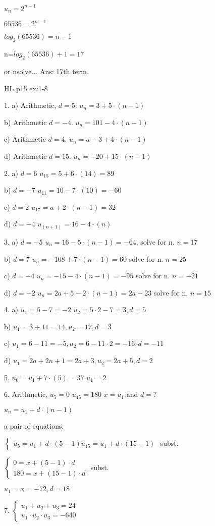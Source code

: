$u_n=2^{n-1}$ 

$65536=2^{n-1}$

$log_2(65536)=n-1$ 

n=$log_2(65536)+1=17$

or nsolve... Ans: 17th term. 

HL p15 ex:1-8 

1. a) Arithmetic, $d=5$. 
$u_n=3+5\cdot (n-1)$

b) Arithmetic $d=-4$. 
$u_n=101-4\cdot(n-1)$ 

c) Arithmetic $d=4$. 
$u_n=a-3+4\cdot(n-1)$

d) Arithmetic $d=15$. 
$u_n=-20+15\cdot (n-1)$

2. a) $d=6$
$u_15=5+6\cdot(14)=89$

b) $d=-7$
$u_11=10-7\cdot(10)=-60$

c) $d=2$
$u_17=a+2\cdot(n-1)=32$

d) $d=-4$
$u_{(n+1)}=16-4\cdot(n)$

3. a) $d=-5$
$u_n=16-5\cdot(n-1)=-64$, solve for n.
$n=17$

b) $d=7$
$u_n=-108+7\cdot(n-1)=60$ solve for n.
$n=25$

c) $d=-4$
$u_n=-15-4\cdot(n-1)=-95$ solve for n.
$n=-21$

d) $d=-2$
$u_n=2a+5-2\cdot(n-1)=2a-23$ solve for n.
$n=15$

4. a) $u_1=5-7=-2$ $u_2=5\cdot2-7=3, d=5$

b) $u_1=3+11=14, u_2=17 ,d=3$

c) $u_1=6-11=-5, u_2=6-11\cdot2=-16, d=-11$

d) $u_1=2a+2n+1=2a+3, u_2=2a+5, d=2$

5. $u_6=u_1+7\cdot(5)=37$
$u_1=2$

6. Arithmetic, $u_5=0$ $u_15=180$
$x=u_1$ and $d=?$

$u_n=u_1+d\cdot(n-1)$

a pair of equations. 

$\begin{cases}
u_5=u_1+d\cdot(5-1)
u_15=u_1+d\cdot(15-1)
\end{cases}$ subst.

$\begin{cases}
0=x+(5-1)\cdot d\\ 
180=x+(15-1)\cdot d
\end{cases}$ subst.

$u_1=x=-72, d=18$

7. $\begin{cases}
u_1+u_2+u_3=24 \\
u_1\cdot u_2\cdot u_3=-640
\end{cases}$

